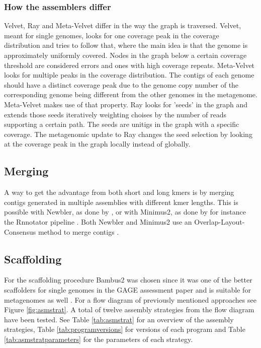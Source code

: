 \documentclass[a4paper,12pt]{report}
\begin{document}
\subsubsection{How the assemblers differ}
Velvet, Ray and Meta-Velvet differ in the way the graph is traversed. Velvet,
meant for single genomes, looks for one coverage peak in the coverage
distribution and tries to follow that, where the main idea is that the genome
is approximately uniformly covered. Nodes in the graph below a certain coverage
threshold are considered errors and ones with high coverage repeats.
Meta-Velvet looks for multiple peaks in the coverage distribution. The contigs
of each genome
should have a distinct coverage peak due to the genome copy number of the
corresponding genome being different from the other genomes in the metagenome. Meta-Velvet
makes use of that property. Ray looks for 'seeds' in the graph and extends
those seeds iteratively weighting choises by the number of reads supporting a
certain path. The seeds are unitigs in the graph with a specific coverage. The
metagenomic update to Ray changes the seed selection by looking at the coverage
peak in the graph locally instead of globally. 


\subsection{Merging}
A way to get the advantage from both short and long kmers is by merging contigs
generated in multiple assemblies with different kmer lengths. This is possible
with Newbler, as done by \citet{Luo22347999}, or with Minimus2, as done by for
instance the Rnnotator pipeline \cite{Martin21106091}. Both Newbler and
Minimus2 use an Overlap-Layout-Consensus method to merge contigs
\cite{Sommer17324286,Miller20211242}.


\subsection{Scaffolding}
For the scaffolding procedure Bambus2 was chosen since it was one of the better
scaffolders for single genomes in the GAGE assessment paper
\cite{Salzberg22147368} and is suitable for metagenomes as well
\cite{Koren21926123}. For a flow diagram of previously mentioned approaches see
Figure \ref{fig:asmstrat}. A total of twelve assembly strategies from the flow
diagram have been tested. See Table \ref{tab:asmstrat} for an overview of the
assembly strategies, Table \ref{tab:programversions} for versions of each
program and Table \ref{tab:asmstratparameters} for the parameters of each
strategy.
\end{document}
